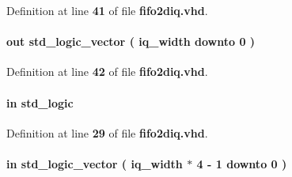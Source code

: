 Definition at line {\bf 41} of file {\bf fifo2diq.\+vhd}.

\paragraph[{D\+I\+Q\+\_\+l}]{ {\bfseries \textcolor{keywordflow}{out}\textcolor{vhdlchar}{ }} {\bfseries \textcolor{comment}{std\+\_\+logic\+\_\+vector}\textcolor{vhdlchar}{ }\textcolor{vhdlchar}{(}\textcolor{vhdlchar}{ }\textcolor{vhdlchar}{ }\textcolor{vhdlchar}{ }\textcolor{vhdlchar}{ }{\bfseries {\bf iq\+\_\+width}} \textcolor{vhdlchar}{ }\textcolor{keywordflow}{downto}\textcolor{vhdlchar}{ }\textcolor{vhdlchar}{ } \textcolor{vhdldigit}{0} \textcolor{vhdlchar}{ }\textcolor{vhdlchar}{)}\textcolor{vhdlchar}{ }} \hspace{0.3cm}{\ttfamily [Port]}}\label{classfifo2diq_a777f2fdc7c32fafa88af2ebd0eae9fc3}


Definition at line {\bf 42} of file {\bf fifo2diq.\+vhd}.

\paragraph[{fidm}]{ {\bfseries \textcolor{keywordflow}{in}\textcolor{vhdlchar}{ }} {\bfseries \textcolor{comment}{std\+\_\+logic}\textcolor{vhdlchar}{ }} \hspace{0.3cm}{\ttfamily [Port]}}\label{classfifo2diq_a97ae5ad9eee26d5f984f95d151f62ec0}


Definition at line {\bf 29} of file {\bf fifo2diq.\+vhd}.

\paragraph[{fifo\+\_\+q}]{ {\bfseries \textcolor{keywordflow}{in}\textcolor{vhdlchar}{ }} {\bfseries \textcolor{comment}{std\+\_\+logic\+\_\+vector}\textcolor{vhdlchar}{ }\textcolor{vhdlchar}{(}\textcolor{vhdlchar}{ }\textcolor{vhdlchar}{ }\textcolor{vhdlchar}{ }\textcolor{vhdlchar}{ }{\bfseries {\bf iq\+\_\+width}} \textcolor{vhdlchar}{$\ast$}\textcolor{vhdlchar}{ } \textcolor{vhdldigit}{4} \textcolor{vhdlchar}{-\/}\textcolor{vhdlchar}{ } \textcolor{vhdldigit}{1} \textcolor{vhdlchar}{ }\textcolor{keywordflow}{downto}\textcolor{vhdlchar}{ }\textcolor{vhdlchar}{ } \textcolor{vhdldigit}{0} \textcolor{vhdlchar}{ }\textcolor{vhdlchar}{)}\textcolor{vhdlchar}{ }} \hspace{0.3cm}{\ttfamily [Port]}}\label{classfifo2diq_a8bdc7decffe2b65e22d22cad747236e3}


